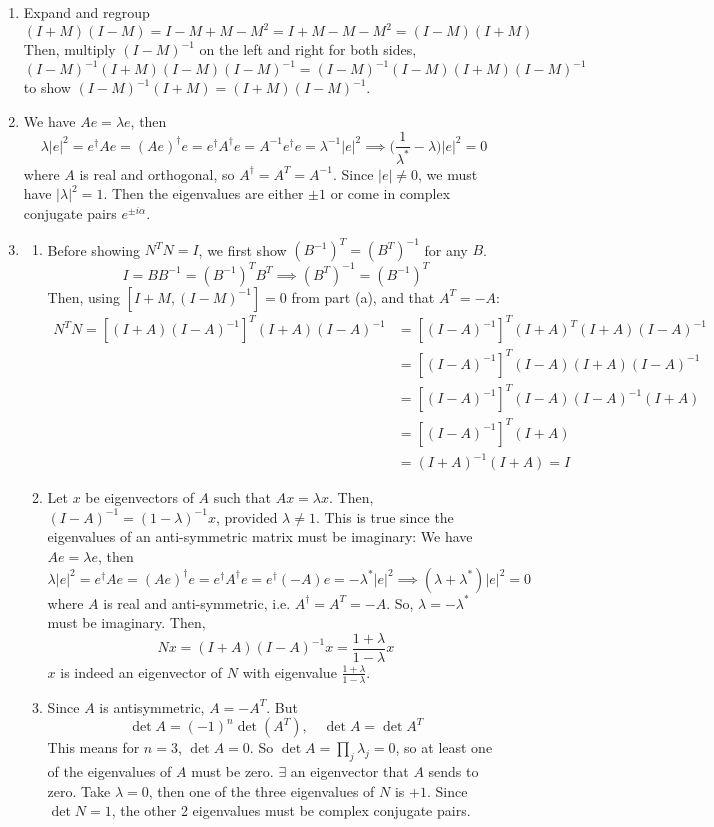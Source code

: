 \documentclass[a4paper]{article}
\begin{document}
\begin{ans}\leavevmode
\begin{enumerate}[label=(\alph*)]
\item Expand and regroup
$$(I+M)(I-M)=I-M+M-M^2=I+M-M-M^2=(I-M)(I+M)$$
Then, multiply $(I-M)^{-1}$ on the left and right for both sides, 
$$(I-M)^{-1}(I+M)(I-M)(I-M)^{-1}=(I-M)^{-1}(I-M)(I+M)(I-M)^{-1}$$
to show $(I-M)^{-1}(I+M)=(I+M)(I-M)^{-1}$.
\item We have $Ae=\lambda e$, then 
$$\lambda|e|^2=e^\dag Ae=(A e)^\dag e=e^\dag A^\dag e=A^{-1}e^\dag e=\lambda^{-1}|e|^2\implies\bigg(\frac{1}{\lambda^*}-\lambda\bigg)|e|^2=0$$
where $A$ is real and orthogonal, so $A^\dag=A^T=A^{-1}$. Since $|e|\neq 0$, we must have $|\lambda|^2=1$.  Then the eigenvalues are either $\pm1$ or come in complex conjugate pairs $e^{\pm i\alpha}$.
\item 
\begin{enumerate}[label=(\roman*)]
\item Before showing $N^TN=I$, we first show $(B^{-1})^T=(B^T)^{-1}$ for any $B$.
$$I=BB^{-1}=(B^{-1})^TB^T\implies (B^T)^{-1}=(B^{-1})^T$$
Then, using $[I+M,(I-M)^{-1}]=0$ from part (a), and that $A^T=-A$:
\begin{align}
    N^TN=[(I+A)(I-A)^{-1}]^T(I+A)(I-A)^{-1}&=[(I-A)^{-1}]^T(I+A)^T(I+A)(I-A)^{-1}\nonumber\\&=[(I-A)^{-1}]^T(I-A)(I+A)(I-A)^{-1}\nonumber\\&=[(I-A)^{-1}]^T(I-A)(I-A)^{-1}(I+A)\nonumber\\&=[(I-A)^{-1}]^T(I+A)\nonumber\\&=(I+A)^{-1}(I+A)=I\nonumber
\end{align}
\item Let $x$ be eigenvectors of $A$ such that $Ax=\lambda x$. Then, $(I-A)^{-1}=(1-\lambda)^{-1}x$, provided $\lambda\neq 1$. This is true since the eigenvalues of an anti-symmetric matrix must be imaginary: We have $Ae=\lambda e$, then 
$$\lambda|e|^2=e^\dag Ae=(A e)^\dag e=e^\dag A^\dag e=e^\dag(-A) e=-\lambda^*|e|^2\implies(\lambda+\lambda^*)|e|^2=0$$
where $A$ is real and anti-symmetric, i.e. $A^\dag=A^T=-A$. So, $\lambda=-\lambda^*$ must be imaginary. Then, 
$$Nx=(I+A)(I-A)^{-1}x=\frac{1+\lambda}{1-\lambda}x$$
$x$ is indeed an eigenvector of $N$ with eigenvalue $\frac{1+\lambda}{1-\lambda}$.
\item Since $A$ is antisymmetric, $A=-A^T$. But 
$$\det A=(-1)^n\det(A^T),\quad\det A=\det A^T$$ 
This means for $n=3$, $\det A=0$. So $\det A=\prod_j\lambda_j=0$, so at least one of the eigenvalues of $A$ must be zero. $\exists$ an eigenvector that $A$ sends to zero. Take $\lambda=0$, then one of the three eigenvalues of $N$ is $+1$. Since $\det N=1$, the other 2 eigenvalues must be complex conjugate pairs.
\end{enumerate}
\end{enumerate}
\end{ans}
\end{document}
